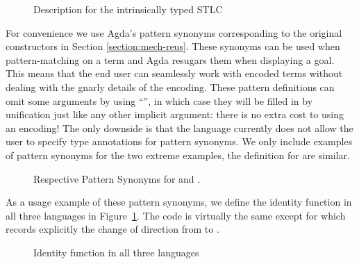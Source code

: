 \begin{figure}[h]
\begin{minipage}{0.4\textwidth}
\end{minipage}\hfill
\begin{minipage}{0.5\textwidth}
\end{minipage}
  \caption{Description for the intrinsically typed STLC}
\end{figure}

For convenience we use Agda's pattern synonyms corresponding to the
original constructors in Section \ref{section:mech-reus}. These
synonyms can be used when pattern-matching on a term and Agda resugars
them when displaying a goal. This means that the end user can
seamlessly work with encoded terms without dealing with the gnarly
details of the encoding.  These pattern definitions can omit some
arguments by using ``\AS{\_}'', in which case they will be filled in
by unification just like any other implicit argument: there is no
extra cost to using an encoding!  The only downside is that the
language currently does not allow the user to specify type annotations
for pattern synonyms. We only include examples of pattern synonyms
for the two extreme examples, the definition for  are similar.

\begin{figure}[h]
\begin{minipage}{0.40\textwidth}
\end{minipage}\hspace{2em}
\begin{minipage}{0.50\textwidth}
\end{minipage}
\caption{Respective Pattern Synonyms for  and .}
\end{figure}

As a usage example of these pattern synonyms, we define the identity
function in all three languages in Figure~\ref{fig:identity}. The code
is virtually the same except for  which records explicitly
the change of direction from  to .

\begin{figure}[h]
\begin{minipage}{0.28\textwidth}
\end{minipage}\hfill
\begin{minipage}{0.30\textwidth}
\end{minipage}\hfill
\begin{minipage}{0.32\textwidth}
\end{minipage}
\caption{Identity function in all three languages}\label{fig:identity}
\end{figure}

